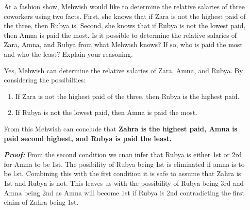 \documentclass[a4paper]{exam}
\begin{document}
\begin{questions}
  \question At a fashion show, Mehwish would like to determine the relative salaries of three coworkers using two facts. First, she knows that if Zara is not the highest paid of the three, then Rubya is. Second, she knows that if Rubya is not the lowest paid, then Amna is paid the most. Is it possible to determine the relative salaries of Zara, Amna, and Rubya from what Mehwish knows? If so, who is paid the most and who the least? Explain your reasoning.
  \begin{solution}
    
    Yes, Mehwish can determine the relative salaries of Zara, Amna, and Rubya. By considering the possibilties:
    \begin{enumerate}
      \item If Zara is not the highest paid of the three, then Rubya is the highest paid. 
      \item If Rubya is not the lowest paid, then Amna is paid the most.
    \end{enumerate}
    From this Mehwish can conclude that \textbf{Zahra is the highest paid, Amna is paid second highest, and Rubya is paid the least.}

    \textbf{\textit{Proof:}} From the second condition we cnan infer that Rubya is either 1st or 2rd for Amna to be 1st. The posibility of Rubya being 1st is eliminated if amna is to be 1st.
    Combining this with the frst condition it is safe to assume that Zahra is 1st and Rubya is not. This leaves us with the possibility of Rubya being 3rd and Amna being 2nd as Amna will become 1st if Rubya is 2nd contradicting the first claim of Zahra being 1st.
  \end{solution}
\end{questions}
\end{document}
